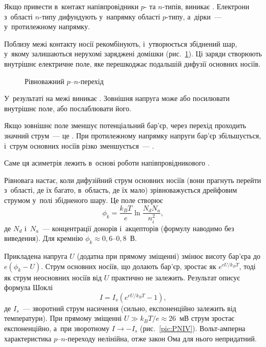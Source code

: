 Якщо привести в~контакт напівпровідники $p$- та $n$-типів, виникає
. Електрони з~області $n$-типу дифундують у~напрямку області
$p$-типу, а~дірки~--- у~протилежному напрямку.

Поблизу межі контакту носії рекомбінують, і~утворюється збіднений шар, у~якому залишаються
нерухомі заряджені домішки (рис.~\ref{pic:PNJunction}). Ці заряди створюють внутрішнє
електричне поле, яке перешкоджає подальшій дифузії основних носіїв.

\begin{figure}[h!]\centering
	\caption{Рівноважний $p$--$n$-перехід\label{pic:PNJunction}}
\end{figure}

У~результаті на межі виникає . Зовнішня напруга може
або посилювати внутрішнє поле, або послаблювати його.

Якщо зовнішнє поле зменшує потенціальний бар'єр, через перехід проходить значний струм~---
це . При протилежному напрямку напруги бар'єр збільшується, і~струм
основних носіїв різко зменшується~--- .

Саме ця асиметрія лежить в~основі роботи напівпровідникового .

Рівновага настає, коли дифузійний струм основних носіїв (вони прагнуть перейти з~області,
де їх багато, в~область, де їх мало) зрівноважується дрейфовим струмом у~полі збідненого
шару. Це поле створює 
\begin{equation}\label{eq:ContactPotential}
	\phi_k=\frac{k_BT}{e}\ln\frac{N_dN_a}{n_i^2},
\end{equation}
де $N_d$ і~$N_a$~--- концентрації донорів і~акцепторів (формулу наводимо без виведення).
Для кремнію $\phi_k\approx0{,}6$--$0{,}8$~В.

Прикладена напруга $U$ (додатна при прямому зміщенні) змінює висоту бар'єра до
$e(\phi_k-U)$. Струм основних носіїв, що долають бар'єр, зростає як $e^{eU/k_BT}$, тоді як
струм неосновних носіїв від $U$ практично не залежить. Результат описує формула Шоклі
\begin{equation}\label{eq:Shockley}
	I=I_s\left(e^{eU/k_BT}-1\right),
\end{equation}
де $I_s$~--- зворотний струм насичення (сильно, експоненційно залежить від температури).
При прямому зміщенні $U\gg k_BT/e\approx26$~мВ струм зростає експоненційно, а~при
зворотному $I\to-I_s$ (рис.~\ref{pic:PNIV}). Вольт-амперна характеристика
$p$--$n$-переходу нелінійна, отже закон Ома для нього непридатний.

